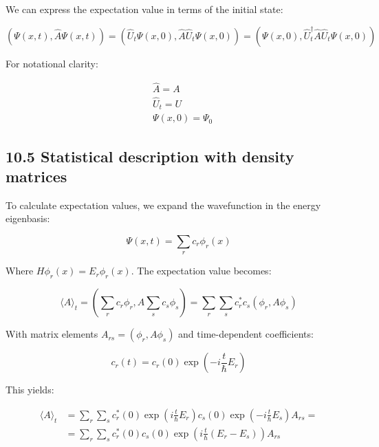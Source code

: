\documentclass[10pt]{article}
\begin{document}
We can express the expectation value in terms of the initial state:

\begin{equation*}
(\Psi(x, t), \hat{A} \Psi(x, t))=\left(\hat{U}_{t} \Psi(x, 0), \hat{A} \hat{U}_{t} \Psi(x, 0)\right)=\left(\Psi(x, 0), \hat{U}_{t}^{\dagger} \hat{A} \hat{U}_{t} \Psi(x, 0)\right) \tag{10.30}
\end{equation*}

For notational clarity:

\begin{align*}
& \hat{A}=A \\
& \hat{U}_{t}=U  \tag{10.31}\\
& \Psi(x, 0)=\Psi_{0}
\end{align*}

\subsection*{10.5 Statistical description with density matrices}
To calculate expectation values, we expand the wavefunction in the energy eigenbasis:

\begin{equation*}
\Psi(x, t)=\sum_{r} c_{r} \phi_{r}(x) \tag{10.32}
\end{equation*}

Where $H \phi_{r}(x)=E_{r} \phi_{r}(x)$. The expectation value becomes:

\begin{equation*}
\langle A\rangle_{t}=\left(\sum_{r} c_{r} \phi_{r}, A \sum_{s} c_{s} \phi_{s}\right)=\sum_{r} \sum_{s} c_{r}^{*} c_{s}\left(\phi_{r}, A \phi_{s}\right) \tag{10.33}
\end{equation*}

With matrix elements $A_{rs} = (\phi_r, A\phi_s)$ and time-dependent coefficients:

\begin{equation*}
c_{r}(t)=c_{r}(0) \exp \left(-i \frac{t}{\hbar} E_{r}\right) \tag{10.34}
\end{equation*}

This yields:

\begin{align*}
\langle A\rangle_{t} & =\sum_{r} \sum_{s} c_{r}^{*}(0) \exp \left(i \frac{t}{\hbar} E_{r}\right) c_{s}(0) \exp \left(-i \frac{t}{\hbar} E_{s}\right) A_{r s}= \\
& =\sum_{r} \sum_{s} c_{r}^{*}(0) c_{s}(0) \exp \left(i \frac{t}{\hbar}\left(E_{r}-E_{s}\right)\right) A_{r s} \tag{10.35}
\end{align*}
\end{document}
